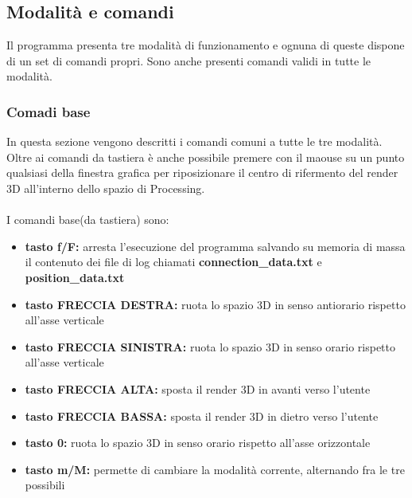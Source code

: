 \documentclass[a4paper]{article}
\begin{document}
    \subsection{Modalità e comandi}
    
    \begin{text}
        Il programma presenta tre modalità di funzionamento e ognuna di queste dispone di un set di comandi propri. Sono anche presenti comandi validi in tutte le modalità.
    \end{text}
    
    \subsubsection{Comadi base}
    
    \begin{text}
        In questa sezione vengono descritti i comandi comuni a tutte le tre modalità. Oltre ai comandi da tastiera è anche possibile premere con il maouse su un punto qualsiasi della finestra grafica per riposizionare il centro di rifermento del render 3D all'interno dello spazio di Processing.  \\ \\
        I comandi base(da tastiera) sono:
    \end{text}
    
    \begin{itemize}
      \item \textbf{tasto f/F:} arresta l'esecuzione del programma salvando su memoria di massa il contenuto dei file di log chiamati \textbf{connection\_data.txt} e \textbf{position\_data.txt}
      \item \textbf{tasto FRECCIA DESTRA:} ruota lo spazio 3D in senso antiorario rispetto all'asse verticale
      \item \textbf{tasto FRECCIA SINISTRA:} ruota lo spazio 3D in senso orario rispetto all'asse verticale
      \item \textbf{tasto FRECCIA ALTA:} sposta il render 3D in avanti verso l'utente
      \item \textbf{tasto FRECCIA BASSA:} sposta il render 3D in dietro verso l'utente
      \item \textbf{tasto 0:} ruota lo spazio 3D in senso orario rispetto all'asse orizzontale
      \item \textbf{tasto m/M:} permette di cambiare la modalità corrente, alternando fra le tre possibili
    \end{itemize}
    
\end{document}
